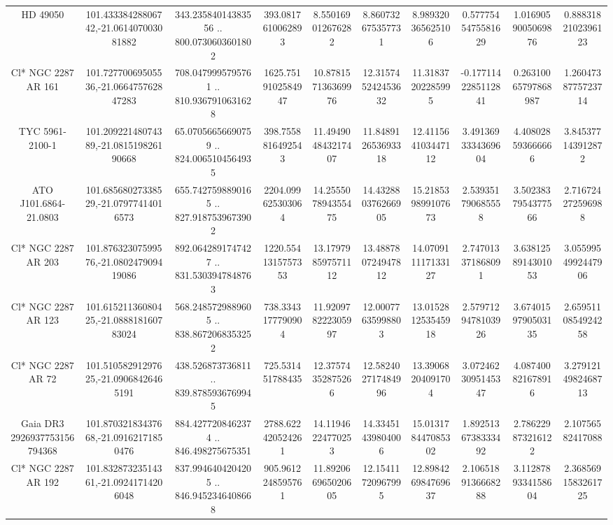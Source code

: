 \begin{table}
\begin{tabular}{cccccccccc}
HD  49050 & 101.43338428806742,-21.061407003081882 & 343.23584014383556 .. 800.0730603601802 & 393.0817610062893 & 8.550169012676282 & 8.860732675357731 & 8.989320365625106 & 0.5777545475581629 & 1.0169059005069876 & 0.8883182102396123 \\
Cl* NGC 2287     AR     161 & 101.72770069505536,-21.066475762847283 & 708.0479995795761 .. 810.9367910631628 & 1625.7519102584947 & 10.878157136369976 & 12.315745242453632 & 11.31837202285995 & -0.1771142285112841 & 0.26310065797868987 & 1.2604738775723714 \\
TYC 5961-2100-1 & 101.20922148074389,-21.081519826190668 & 65.07056656690759 .. 824.0065104564935 & 398.7558816492543 & 11.494904843217407 & 11.848912653693318 & 12.411564103447112 & 3.4913693334369604 & 4.408028593666666 & 3.845377143912872 \\
ATO J101.6864-21.0803 & 101.68568027338529,-21.07977414016573 & 655.7427598890165 .. 827.9187539673902 & 2204.099625303064 & 14.255507894355475 & 14.432880376266905 & 15.218539899107673 & 2.539351790685558 & 3.5023837954377566 & 2.716724272596988 \\
Cl* NGC 2287     AR     203 & 101.87632307599576,-21.080247909419086 & 892.0642891747427 .. 831.5303947848763 & 1220.5541315757353 & 13.179798597571112 & 13.488780724947812 & 14.070911117133127 & 2.747013371868091 & 3.6381258914301053 & 3.0559954992447906 \\
Cl* NGC 2287     AR     123 & 101.61521136080425,-21.088818160783024 & 568.2485729889605 .. 838.8672068353252 & 738.3343177790904 & 11.920978222305997 & 12.00077635998803 & 13.015281253545918 & 2.5797129478103926 & 3.6740159790503135 & 2.6595110854924258 \\
Cl* NGC 2287     AR      72 & 101.51058291297625,-21.09068426465191 & 438.526873736811 .. 839.8785936769945 & 725.531451788435 & 12.37574352875266 & 12.582402717484996 & 13.39068204091704 & 3.0724623095145347 & 4.087400821678916 & 3.2791214982468713 \\
Gaia DR3 2926937753156794368 & 101.87032183437668,-21.09162171850476 & 884.4277208462374 .. 846.498275675351 & 2788.622420524261 & 14.11946224770253 & 14.33451439804006 & 15.013178447085302 & 1.8925136738333492 & 2.786229873216122 & 2.10756582417088 \\
Cl* NGC 2287     AR     192 & 101.83287323514361,-21.09241714206048 & 837.9946404204205 .. 846.9452346408668 & 905.9612248595761 & 11.892066965020605 & 12.15411720967995 & 12.898426984769637 & 2.1065189136668288 & 3.1128789334158604 & 2.3685691583261725 \\

\end{tabular}
\end{table}
